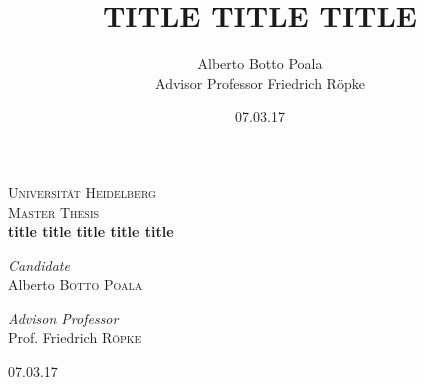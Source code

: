 \documentclass[11pt]{article}
\title{TITLE TITLE TITLE}
\author{Alberto Botto Poala\\
Advisor Professor Friedrich Röpke}
\date{07.03.17}
\numberwithin{equation}{section}
\begin{document}
\begin{titlepage}
\begin{center}


\textsc{\LARGE Universität Heidelberg}\\[1.8cm]

\textsc{\Large Master Thesis}\\[0.5cm]


{ \huge \bfseries title title title title title \\[0.5cm] }



\begin{minipage}{0.4\textwidth}
\begin{flushleft} \large
\emph{Candidate}\\
Alberto \textsc{Botto Poala}
\end{flushleft}
\end{minipage}
\begin{minipage}{0.4\textwidth}
\begin{flushright} \large
\emph{Advison Professor} \\
Prof. Friedrich \textsc{Röpke}
\end{flushright}
\end{minipage}

\vfill

{07.03.17}

\end{center}
\end{titlepage}

\tableofcontents
\maketitle

\end{document}
